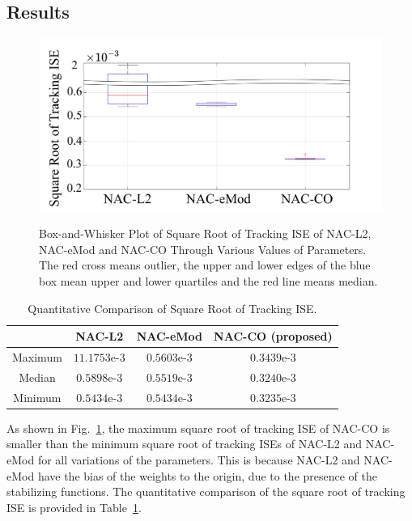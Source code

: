 \subsection{Results}

\begin{figure}[!t]      
    \centering
    {\includegraphics[width=.85\linewidth]{imgs/BoxWhisker.drawio.png}}
    \caption{Box-and-Whisker Plot of Square Root of Tracking ISE of NAC-L2, NAC-eMod and NAC-CO Through Various 
 Values of Parameters.
    The red cross means outlier, the upper and lower edges of the blue box mean upper and lower quartiles and the red line means median.}
    \label{chap3:fig:box-whisker}
\end{figure}

\begin{table}[!t]
    \renewcommand{\arraystretch}{1.3}
    \caption{Quantitative Comparison of Square Root of Tracking ISE.}
    \centering
    \begin{tabular}{|c||c|c|c|}
    \hline
     & \textbf{NAC-L2} & \textbf{NAC-eMod} & \textbf{NAC-CO} (proposed) 
     \\
    \hline 
    Maximum         & $11.1753$e-3 & $0.5603$e-3 & $0.3439$e-3 \\
    \hline
    Median          & $0.5898$e-3 & $0.5519$e-3 & $0.3240$e-3 \\
    \hline
    Minimum         & $0.5434$e-3 & $0.5434$e-3 & $0.3235$e-3 \\
    \hline
    \end{tabular}
    \label{chap3:table:error_norm}
\end{table}

As shown in Fig.~\ref{chap3:fig:box-whisker}, the maximum square root of tracking ISE of NAC-CO is smaller than the minimum square root of tracking ISEs of NAC-L2 and NAC-eMod for all variations of the parameters.
This is because NAC-L2 and NAC-eMod have the bias of the weights to the origin, due to the presence of the stabilizing functions.
The quantitative comparison of the square root of tracking ISE is provided in Table~\ref{chap3:table:error_norm}.

